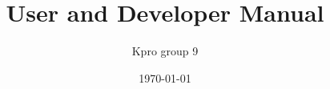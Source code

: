 \documentclass[a4paper, 11pt]{report}
\title{User and Developer Manual}
\author{Kpro group 9}
\date{\today}
\begin{document}
\begin{standalone}
    
\end{standalone}
\end{document}
